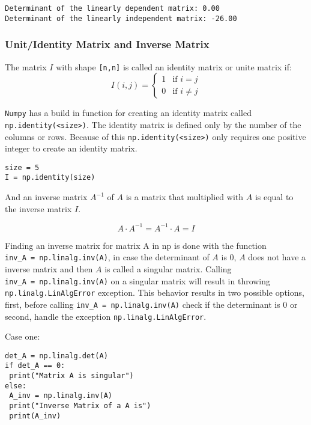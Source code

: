 \documentclass[11pt]{article}
\begin{document}
    \begin{Verbatim}[commandchars=\\\{\}]
Determinant of the linearly dependent matrix: 0.00
Determinant of the linearly independent matrix: -26.00
    \end{Verbatim}

    \subsubsection{Unit/Identity Matrix and Inverse
Matrix}\label{unitidentity-matrix-and-inverse-matrix}

The matrix \(I\) with shape \texttt{{[}n,n{]}} is called an identity
matrix or unite matrix if: \[
I(i,j) =
\begin{cases}
1 & \text{if } i = j \\
0 & \text{if } i \neq j
\end{cases}
\]

\texttt{Numpy} has a build in function for creating an identity matrix
called \texttt{np.identity(\textless{}size\textgreater{})}. The identity
matrix is defined only by the number of the columns or rows. Because of
this \texttt{np.identity(\textless{}size\textgreater{})} only requires
one positive integer to create an identity matrix.

\begin{verbatim}
size = 5
I = np.identity(size)
\end{verbatim}

And an inverse matrix \(A^{-1}\) of \(A\) is a matrix that multiplied
with \(A\) is equal to the inverse matrix \(I\).

\[ A \cdot A^{-1} =  A^{-1} \cdot A = I \]

Finding an inverse matrix for matrix A in np is done with the function
\texttt{inv\_A\ =\ np.linalg.inv(A)}, in case the determinant of \(A\)
is \(0\), \(A\) does not have a inverse matrix and then \(A\) is called
a singular matrix. Calling \texttt{inv\_A\ =\ np.linalg.inv(A)} on a
singular matrix will result in throwing \texttt{np.linalg.LinAlgError}
exception. This behavior results in two possible options, first, before
calling \texttt{inv\_A\ =\ np.linalg.inv(A)} check if the determinant is
0 or second, handle the exception \texttt{np.linalg.LinAlgError}.

Case one:

\begin{verbatim}
det_A = np.linalg.det(A)
if det_A == 0:
 print("Matrix A is singular")
else:
 A_inv = np.linalg.inv(A)
 print("Inverse Matrix of a A is")
 print(A_inv)
\end{verbatim}
\end{document}
